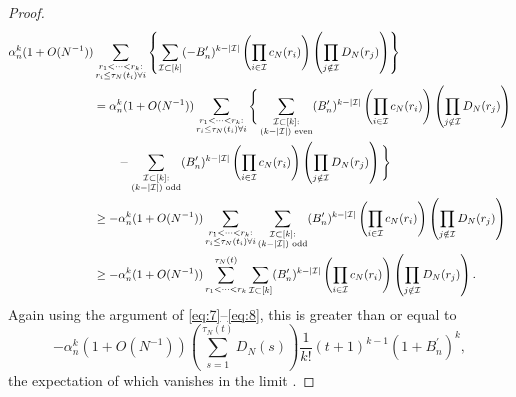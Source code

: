 \documentclass{article}
\newcommand{\1}[1]{\mathbbm{1}_{#1}}
\begin{document}
\begin{proof}
\begin{align}
\alpha_n^k (1 + O(N^{-1}) ) &\sum_{\substack{r_1 <\dots< r_k :\\ r_i \leq \tau_N(t_i) \forall i}}
\left\{ \sum_{\mathcal{I} \subset [k]} (-B_n^\prime)^{k-|\mathcal{I}|}
\left( \prod_{i\in\mathcal{I}} c_N(r_i) \right)
\left( \prod_{j\notin\mathcal{I}} D_N(r_j) \right)
\right\} \notag\\
&= \alpha_n^k (1 + O(N^{-1}) )
\sum_{\substack{r_1 <\dots< r_k :\\ r_i \leq \tau_N(t_i) \forall i}}
\Bigg\{ \sum_{\substack{\mathcal{I} \subset [k]: \\ (k-|\mathcal{I}|) \text{ even} }} (B_n^\prime)^{k-|\mathcal{I}|}
\left( \prod_{i\in\mathcal{I}} c_N(r_i) \right)
\left( \prod_{j\notin\mathcal{I}} D_N(r_j) \right) \notag\\
&\qquad- \sum_{\substack{\mathcal{I} \subset [k]: \\ (k-|\mathcal{I}|) \text{ odd} }} (B_n^\prime)^{k-|\mathcal{I}|}
\left( \prod_{i\in\mathcal{I}} c_N(r_i) \right)
\left( \prod_{j\notin\mathcal{I}} D_N(r_j) \right) \Bigg\} \notag\\
&\geq - \alpha_n^k (1 + O(N^{-1}) )
\sum_{\substack{r_1 <\dots< r_k :\\ r_i \leq \tau_N(t_i) \forall i}}
\sum_{\substack{\mathcal{I} \subset [k]: \\ (k-|\mathcal{I}|) \text{ odd} }} (B_n^\prime)^{k-|\mathcal{I}|}
\left( \prod_{i\in\mathcal{I}} c_N(r_i) \right)
\left( \prod_{j\notin\mathcal{I}} D_N(r_j) \right) \notag\\
&\geq - \alpha_n^k (1 + O(N^{-1}) )
\sum_{r_1 <\dots< r_k}^{\tau_N(t)}
\sum_{ \mathcal{I} \subset [k] } (B_n^\prime)^{k-|\mathcal{I}|}
\left( \prod_{i\in\mathcal{I}} c_N(r_i) \right)
\left( \prod_{j\notin\mathcal{I}} D_N(r_j) \right) . \label{eq:79a}
\end{align}
Again using the argument of \eqref{eq:7}--\eqref{eq:8}, this is greater than or equal to
\begin{equation}
- \alpha_n^k (1 + O(N^{-1}) ) \left( \sum_{s=1}^{\tau_N(t)} D_N(s) \right) \frac{1}{k!} (t+1)^{k-1} (1 + B_n^\prime)^k , \label{eq:80a}
\end{equation}
the expectation of which vanishes in the limit \citep[Equation (3.5)]{brown2021}.

\end{proof}
\end{document}
